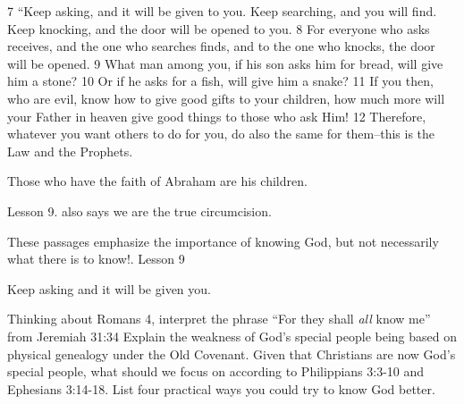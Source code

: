 \begin{bible}
7 ``Keep asking, and it will be given to you. Keep searching, and you will find. Keep knocking, and the door will be opened to you. 8 For everyone who asks receives, and the one who searches finds, and to the one who knocks, the door will be opened. 9 What man among you, if his son asks him for bread, will give him a stone? 10 Or if he asks for a fish, will give him a snake? 11 If you then, who are evil, know how to give good gifts to your children, how much more will your Father in heaven give good things to those who ask Him! 12 Therefore, whatever you want others to do for you, do also the same for them--this is the Law and the Prophets.

\end{bible}

\begin{discussion}


 Those who have the faith of Abraham are his children.

 Lesson 9. also says we are the true circumcision.


These passages emphasize the importance of knowing God, but not necessarily what there is to know!.
 Lesson 9


 Keep asking and it will be given you.

\end{discussion}

\begin{questions}
\q Thinking about Romans 4, interpret the phrase ``For they shall \emph{all} know me'' from Jeremiah 31:34
\q Explain the weakness of God's special people being based on physical genealogy under the Old Covenant.
\q Given that Christians are now God's special people, what should we focus on according to Philippians 3:3-10 and Ephesians 3:14-18.
\q List four practical ways you could try to know God better.
\end{questions}